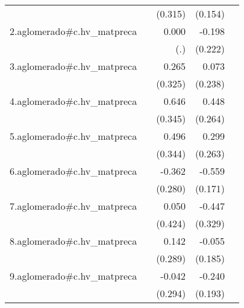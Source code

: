 {\begin{longtable}{l*{4}{D{.}{.}{-1}}}
            &                     &     (0.315)         &     (0.154)         &                     \\
\addlinespace
2.aglomerado#c.hv\_matpreca&                     &       0.000         &      -0.198         &                     \\
            &                     &         (.)         &     (0.222)         &                     \\
\addlinespace
3.aglomerado#c.hv\_matpreca&                     &       0.265         &       0.073         &                     \\
            &                     &     (0.325)         &     (0.238)         &                     \\
\addlinespace
4.aglomerado#c.hv\_matpreca&                     &       0.646         &       0.448         &                     \\
            &                     &     (0.345)         &     (0.264)         &                     \\
\addlinespace
5.aglomerado#c.hv\_matpreca&                     &       0.496         &       0.299         &                     \\
            &                     &     (0.344)         &     (0.263)         &                     \\
\addlinespace
6.aglomerado#c.hv\_matpreca&                     &      -0.362         &      -0.559\sym{**} &                     \\
            &                     &     (0.280)         &     (0.171)         &                     \\
\addlinespace
7.aglomerado#c.hv\_matpreca&                     &       0.050         &      -0.447         &                     \\
            &                     &     (0.424)         &     (0.329)         &                     \\
\addlinespace
8.aglomerado#c.hv\_matpreca&                     &       0.142         &      -0.055         &                     \\
            &                     &     (0.289)         &     (0.185)         &                     \\
\addlinespace
9.aglomerado#c.hv\_matpreca&                     &      -0.042         &      -0.240         &                     \\
            &                     &     (0.294)         &     (0.193)         &                     \\

\end{longtable}}
